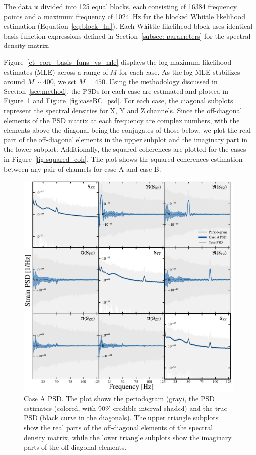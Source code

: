 \documentclass[%
 reprint,
 amsmath,amssymb,
 aps,
 nofootinbib,
]{revtex4-2}
\begin{document}
The data is divided into 125 equal blocks, each consisting of \num{16 384} frequency points and a maximum frequency of \SI{1024}{Hz} for the blocked Whittle likelihood estimation (Equation~\ref{eq:block_lnl}).
Each Whittle likelihood block uses identical basis function expressions defined in Section~\ref{subsec: parameters} for the spectral density matrix.

Figure~\ref{et_corr_basis_funs_vs_mle} displays the log maximum
likelihood estimates (MLE) across a range of $M$ for each case.
As the log MLE stabilizes around $M\sim400$, we set $M=450$.
Using the methodology discussed in Section~\ref{sec:method}, the PSDs for each case are estimated and plotted in Figure~\ref{fig:caseA_psd} and Figure~\ref{fig:caseBC_psd}. For each case, the diagonal subplots represent the spectral densities for X, Y and Z channels. Since the off-diagonal elements of the PSD matrix at each frequency are complex numbers, with the elements above the diagonal being the conjugates of those below, we plot the real part of the off-diagonal elements in the upper subplot and the imaginary part in the lower subplot.
Additionally, the squared coherences are plotted for the cases in Figure~\ref{fig:squared_coh}. The plot shows the squared coherences estimation between any pair of channels for case A and case B.


\begin{figure}
\centering
\includegraphics[width=\textwidth]{caseA_psd.pdf}
\caption{Case A PSD. The plot shows the periodogram (gray), the PSD estimates (colored, with 90\% credible interval shaded) and the true PSD (black curve in the diagonals). The upper triangle subplots show the real parts of the off-diagonal elements of the spectral density matrix, while the lower triangle subplots show the imaginary parts of the off-diagonal elements.}
\label{fig:caseA_psd}
\end{figure}
\end{document}
